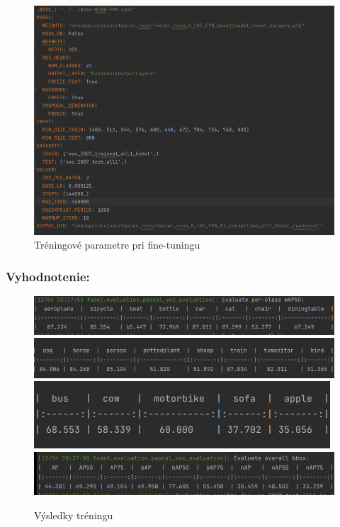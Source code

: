 \begin{figure}[!hbt]
\includegraphics[width=\textwidth]{images/Training_parameters.png}
\caption{Tréningové parametre pri fine-tuningu}
\label{fig:image}
\end{figure}

\subsubsection{Vyhodnotenie:}

\begin{figure}[!hbt]
\includegraphics[width=\textwidth]{images/eval1.png}
\includegraphics[width=\textwidth]{images/eval2.png}
\includegraphics[width=\textwidth]{images/eval3.png}
\includegraphics[width=\textwidth]{images/eval4.png}
\caption{Výsledky tréningu}
\label{fig:image}
\end{figure}


